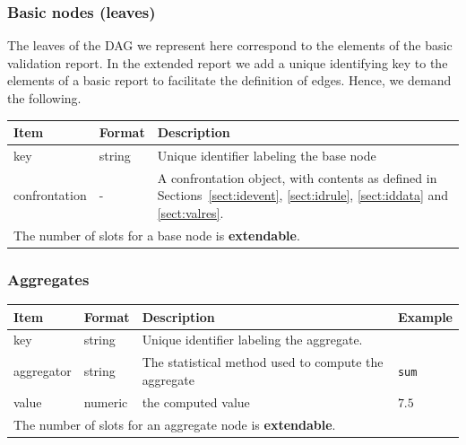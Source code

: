 \documentclass[a4paper, 11pt,titlepage]{article}
\newcommand{\code}[1]{\texttt{#1}}
\begin{document}
\subsubsection{Basic nodes (leaves)}
The leaves of the DAG we represent here correspond to the elements of 
the basic validation report. In the extended report we add a unique
identifying key to the elements of a basic report to facilitate the
definition of edges. Hence, we demand the following.

\begin{center}
\begin{tabular}{|lp{}p{}|}
\hline
\textbf{Item} & \textbf{Format} & \textbf{Description} \\
\hline
key           & string & Unique identifier labeling the base node  \\
confrontation & -      & A confrontation object, with contents as defined in
Sections~\ref{sect:idevent}, \ref{sect:idrule}, \ref{sect:iddata} and \ref{sect:valres}. \\
\hline
\multicolumn{3}{|l|}{The number of slots for a base node is \textbf{extendable}.}\\
\hline
\end{tabular}
\end{center}



\subsubsection{Aggregates}

\begin{center}
\begin{tabular}{|lp{}p{}p{}|}
\hline
\textbf{Item} & \textbf{Format} & \textbf{Description} &\textbf{Example}\\
\hline
key          & string & Unique identifier labeling the aggregate. & \\
aggregator   & string & The statistical method used to compute the aggregate & \code{sum}\\
value        & numeric& the computed value & $7.5$\\
\hline
\multicolumn{4}{|l|}{The number of slots for an aggregate node is \textbf{extendable}.
}\\
\hline
\end{tabular}
\end{center}
\end{document}
